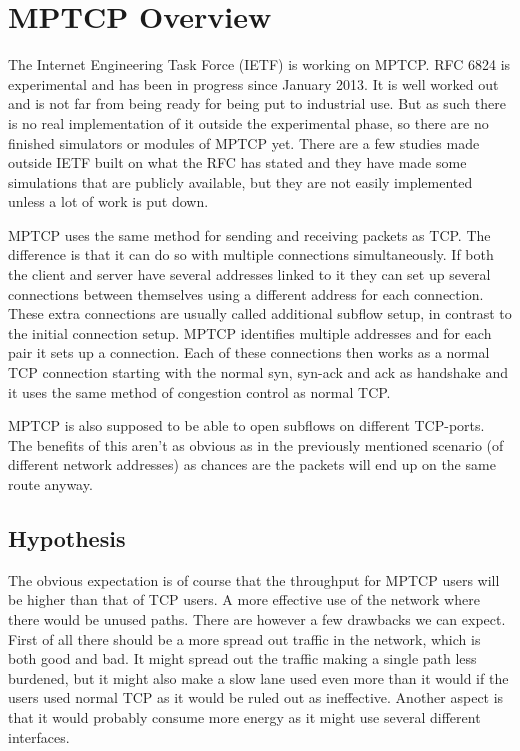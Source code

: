 \documentclass[11pt,twocolumn]{article}
\begin{document}
\section{MPTCP Overview}
The Internet Engineering Task Force (IETF) is working on MPTCP. RFC 6824 is experimental and has been in progress since January 2013. It is well worked out and is not far from being ready for being put to industrial use. But as such there is no real implementation of it outside the experimental phase, so there are no finished simulators or modules of MPTCP yet. There are a few studies made outside IETF built on what the RFC has stated and they have made some simulations that are publicly available, but they are not easily implemented unless a lot of work is put down.

MPTCP uses the same method for sending and receiving packets as TCP. The difference is that it can do so with multiple connections simultaneously. If both the client and server have several addresses linked to it they can set up several connections between themselves using a different address for each connection. These extra connections are usually called additional subflow setup, in contrast to the initial connection setup. MPTCP identifies multiple addresses and for each pair it sets up a connection. Each of these connections then works as a normal TCP connection starting with the normal syn, syn-ack and ack as handshake and it uses the same method of congestion control as normal TCP.

MPTCP is also supposed to be able to open subflows on different TCP-ports. The benefits of this  aren't as obvious as in the previously mentioned scenario (of different network addresses) as chances are the packets will end up on the same route anyway. 

\subsection{Hypothesis}

The obvious expectation is of course that the throughput for MPTCP users will be higher than that of TCP users. A more effective use of the network where there would be unused paths. There are however a few drawbacks we can expect. First of all there should be a more spread out traffic in the network, which is both good and bad. It might spread out the traffic making a single path less burdened, but it might also make a slow lane used even more than it would if the users used normal TCP as it would be ruled out as ineffective. Another aspect is that it would probably consume more energy as it might use several different interfaces. 
\end{document}
